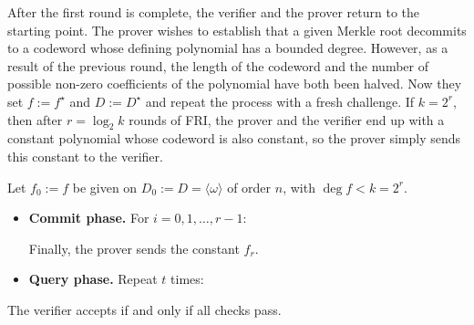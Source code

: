 \documentclass[../../book]{subfiles}
\begin{document}

After the first round is complete, the verifier and the prover return to the starting point. The prover wishes to establish that a given Merkle root decommits to a codeword whose defining polynomial has a bounded degree. However, as a result of the previous round, the length of the codeword and the number of possible non-zero coefficients of the polynomial have both been halved. Now they set $f := f^\star$ and $D := D^\star$ and repeat the process with a fresh challenge. If $k = 2^r$, then after $r = \log_2 k$ rounds of FRI, the prover and the verifier end up with a constant polynomial whose codeword is also constant, so the prover simply sends this constant to the verifier.

\begin{definition}\label{def:fri}
  Let $f_0 := f$ be given on $D_0 := D = \langle \omega \rangle$ of order $n$, with $\deg f < k = 2^r$.
  \begin{itemize}
    \item \textbf{Commit phase.} For $i = 0, 1, \ldots, r-1$:
    Finally, the prover sends the constant $f_r$.
    \item \textbf{Query phase.} Repeat $t$ times:
  \end{itemize}
  The verifier accepts if and only if all checks pass.
\end{definition}
\end{document}
